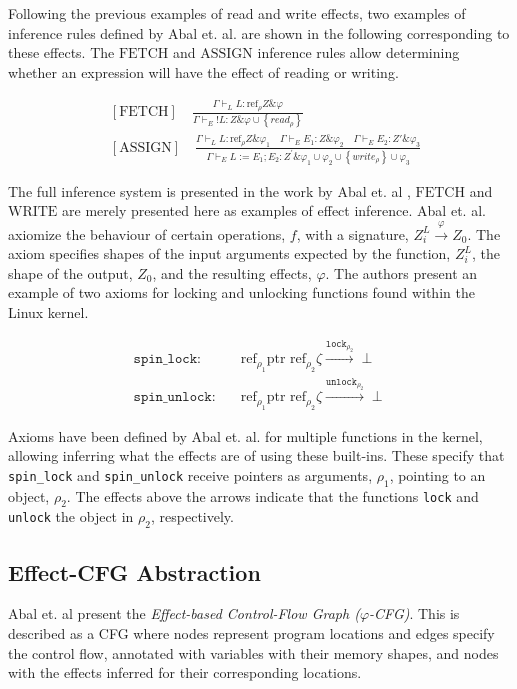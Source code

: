 \newpar Following the previous examples of read and write effects, two examples of inference rules defined by Abal et. al. are shown in the following corresponding to these effects. The $\text{FETCH}$ and $\text{ASSIGN}$ inference rules allow determining whether an expression will have the effect of reading or writing. 

\begin{equation*}
\begin{aligned}
    &[\text{FETCH}] \quad \frac{\Gamma \vdash_{L} L: \text{ref}_{\rho} Z \& \varphi}{\Gamma \vdash_{E} {!L}: Z \& \varphi \cup\left\{r e a d_{\rho}\right\}}\\
    &[\text{ASSIGN}] \quad \frac{\Gamma \vdash_{L} L: \mathrm{ref}_{\rho} Z \& \varphi_{1} \quad \Gamma \vdash_{E} E_{1}: Z \& \varphi_{2} \quad \Gamma \vdash_{E} E_{2}: Z' \& \varphi_{3}}{\Gamma \vdash_{E} L:=E_{1} ; E_{2}: Z^{\prime} \& \varphi_{1} \cup \varphi_{2} \cup\left\{w r i t e_{\rho}\right\} \cup \varphi_{3}}
\end{aligned}
\end{equation*}

\newpar The full inference system is presented in the work by Abal et. al \cite{Abal2017EffectiveBF}, $\text{FETCH}$ and $\text{WRITE}$ are merely presented here as examples of effect inference. Abal et. al. axiomize the behaviour of certain operations, $f$, with a signature, $Z_{i}^{L} \stackrel{\varphi}{\rightarrow} Z_0$. The axiom specifies shapes of the input arguments expected by the function, $Z_{i}^{L}$, the shape of the output, $Z_0$, and the resulting effects, $\varphi$. The authors present an example of two axioms for locking and unlocking functions found within the Linux kernel. 

\begin{equation*}
\begin{aligned}
        \texttt{spin\_lock}: \quad & \text{ref}_{\rho_1} \text{ptr } \text{ref}_{\rho_2} \zeta \xrightarrow{{\texttt{lock}}_{\rho_2}}\perp \\
        \texttt{spin\_unlock}: \quad & \text{ref}_{\rho_1} \text{ptr } \text{ref}_{\rho_2} \zeta \xrightarrow{{\texttt{unlock}}_{\rho_2}}\perp
\end{aligned}
\end{equation*}

\newpar Axioms have been defined by Abal et. al. for multiple functions in the kernel, allowing inferring what the effects are of using these built-ins. These specify that \texttt{spin\_lock} and \texttt{spin\_unlock} receive pointers as arguments, $\rho_1$, pointing to an object, $\rho_2$. The effects above the arrows indicate that the functions \texttt{lock} and \texttt{unlock} the object in $\rho_2$, respectively.

\subsection{Effect-CFG Abstraction}
Abal et. al present the \textit{Effect-based Control-Flow Graph ($\varphi$-CFG)}. This is described as a CFG where nodes represent program locations and edges specify the control flow, annotated with variables with their memory shapes, and nodes with the effects inferred for their corresponding locations. 